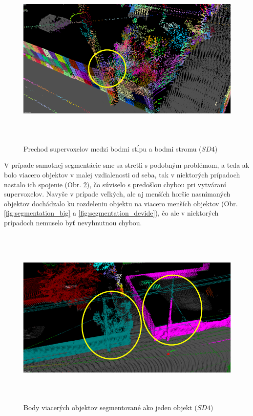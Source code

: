 \begin{figure}[!htbp]
  \centering
  \includegraphics[width=16cm, height=9cm]{img/supervoxel_connecting.png}
  \caption{Prechod supervoxelov medzi bodmi stĺpu a bodmi stromu ($SD4$)} 
  \label{fig:supervoxel_connecting}
\end{figure} 

\indent V prípade samotnej segmentácie sme sa stretli s podobným problémom, a teda ak bolo viacero objektov v malej vzdialenosti od seba, tak v niektorých prípadoch nastalo ich spojenie (Obr. \ref{fig:segmentation_connecting}), čo súviselo s predošlou chybou pri vytváraní supervoxelov. Navyše v prípade veľkých, ale aj menších horšie nasnímaných objektov dochádzalo ku rozdeleniu objektu na viacero menších objektov (Obr. \ref{fig:segmentation_big} a \ref{fig:segmentation_devide}), čo ale v niektorých prípadoch nemuselo byť nevyhnutnou chybou. 

\begin{figure}[!htbp]
  \centering
  \includegraphics[width=16cm, height=9cm]{img/segmentation_connecting.png}
  \caption{Body viacerých objektov segmentované ako jeden objekt ($SD4$)} 
  \label{fig:segmentation_connecting}
\end{figure} 

